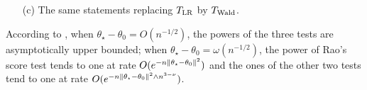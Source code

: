 \begin{proposition}
\begin{enumerate}
        \item[(c)] The same statements replacing $T_{\text{LR}}$ by $T_{\text{Wald}}$.
    \end{enumerate}
\end{proposition}


According to , when $\theta_\star - \theta_0 = O(n^{-1/2})$, the powers of the three tests are asymptotically upper bounded; when $\theta_\star - \theta_0 = \omega(n^{-1/2})$, the power of Rao's score test tends to one at rate $O(e^{-n \left\lVert \theta_\star - \theta_0 \right\rVert^2})$ and the ones of the other two tests tend to one at rate $O(e^{-n \left\lVert \theta_\star - \theta_0 \right\rVert^2 \wedge n^{3-\nu}})$.
